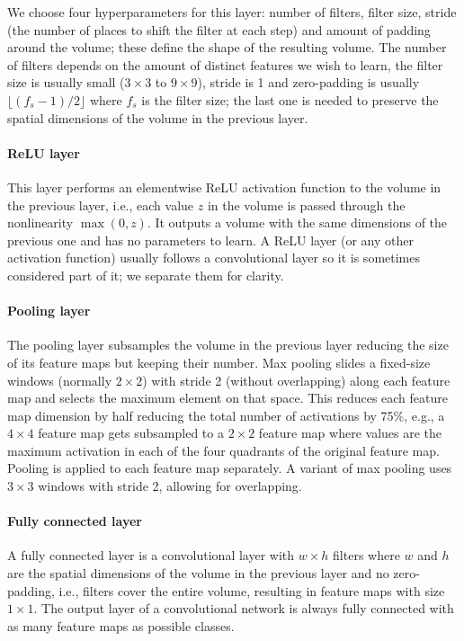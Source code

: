 We choose four hyperparameters for this layer: number of filters, filter size, stride (the number of places to shift the filter at each step) and amount of padding around the volume; these define the shape of the resulting volume. The number of filters depends on the amount of distinct features we wish to learn, the filter size is usually small ($3\times3$ to $9\times9$), stride is 1 and zero-padding is usually $\lfloor (f_s-1)/2\rfloor$ where $f_s$ is the filter size; the last one is needed to preserve the spatial dimensions of the volume in the previous layer.

\paragraph{ReLU layer} This layer performs an elementwise ReLU activation function to the volume in the previous layer, i.e., each value $z$ in the volume is passed through the nonlinearity $\max(0,z)$. It outputs a volume with the same dimensions of the previous one and has no parameters to learn. A ReLU layer (or any other activation function) usually follows a convolutional layer so it is sometimes considered part of it; we separate them for clarity. 

\paragraph{Pooling layer} The pooling layer subsamples the volume in the previous layer reducing the size of its feature maps but keeping their number. Max pooling slides a fixed-size windows (normally $2\times2$) with stride 2 (without overlapping) along each feature map and selects the maximum element on that space. This reduces each feature map dimension by half reducing the total number of activations by 75\%, e.g., a $4\times4$ feature map gets subsampled to a $2\times 2$ feature map where values are the maximum activation in each of the four quadrants of the original feature map. Pooling is applied to each feature map separately. A variant of max pooling uses $3\times 3$ windows with stride 2, allowing for overlapping.

\paragraph{Fully connected layer} A fully connected layer is a convolutional layer with $w\times h$ filters where $w$ and $h$ are the spatial dimensions of the volume in the previous layer and no zero-padding, i.e., filters cover the entire volume, resulting in feature maps with size $1 \times 1$. The output layer of a convolutional network is always fully connected with as many feature maps as possible classes.%


